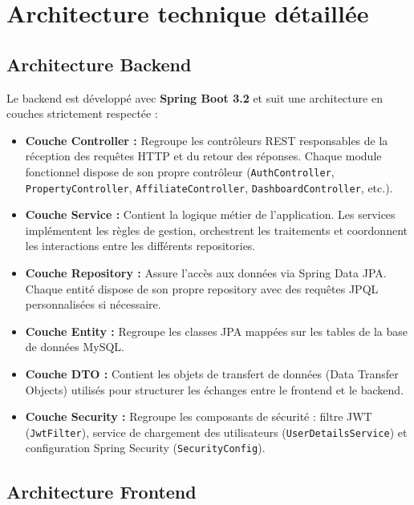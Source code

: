 \documentclass[a4paper,12pt]{report}
\begin{document}

\section{Architecture technique détaillée}

\subsection{Architecture Backend}

Le backend est développé avec \textbf{Spring Boot 3.2} et suit une architecture en couches strictement respectée :

\begin{itemize}
    \item \textbf{Couche Controller :} Regroupe les contrôleurs REST responsables de la réception des requêtes HTTP et du retour des réponses. Chaque module fonctionnel dispose de son propre contrôleur (\texttt{AuthController}, \texttt{PropertyController}, \texttt{AffiliateController}, \texttt{DashboardController}, etc.).
    \item \textbf{Couche Service :} Contient la logique métier de l'application. Les services implémentent les règles de gestion, orchestrent les traitements et coordonnent les interactions entre les différents repositories.
    \item \textbf{Couche Repository :} Assure l'accès aux données via Spring Data JPA. Chaque entité dispose de son propre repository avec des requêtes JPQL personnalisées si nécessaire.
    \item \textbf{Couche Entity :} Regroupe les classes JPA mappées sur les tables de la base de données MySQL.
    \item \textbf{Couche DTO :} Contient les objets de transfert de données (Data Transfer Objects) utilisés pour structurer les échanges entre le frontend et le backend.
    \item \textbf{Couche Security :} Regroupe les composants de sécurité : filtre JWT (\texttt{JwtFilter}), service de chargement des utilisateurs (\texttt{UserDetailsService}) et configuration Spring Security (\texttt{SecurityConfig}).
\end{itemize}

\subsection{Architecture Frontend}
\end{document}

